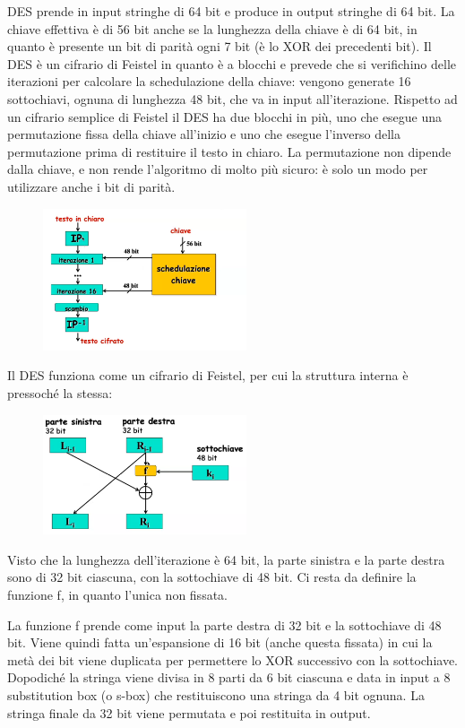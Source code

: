 DES prende in input stringhe di 64 bit e produce in output stringhe di 64 bit. La chiave effettiva è di 56 bit anche se la lunghezza della chiave è di 64 bit, in quanto è presente un bit di parità ogni 7 bit (è lo XOR dei precedenti bit). Il DES è un cifrario di Feistel in quanto è a blocchi e prevede che si verifichino delle iterazioni per calcolare la schedulazione della chiave: vengono generate 16 sottochiavi, ognuna di lunghezza 48 bit, che va in input all'iterazione. Rispetto ad un cifrario semplice di Feistel il DES ha due blocchi in più, uno che esegue una permutazione fissa della chiave all'inizio e uno che esegue l'inverso della permutazione prima di restituire il testo in chiaro. La permutazione non dipende dalla chiave, e non rende l'algoritmo di molto più sicuro: è solo un modo per utilizzare anche i bit di parità.

\begin{figure}[htb!]
    \centering
    \includegraphics[width=6cm]{./Images/cap1/1.2.png}
\end{figure}

Il DES funziona come un cifrario di Feistel, per cui la struttura interna è pressoché la stessa:

\begin{figure}[htb!]
    \centering
    \includegraphics[width=6cm]{./Images/cap1/1.3.png}
\end{figure}

Visto che la lunghezza dell'iterazione è 64 bit, la parte sinistra e la parte destra sono di 32 bit ciascuna, con la sottochiave di 48 bit. Ci resta da definire la funzione f, in quanto l'unica non fissata.

La funzione f prende come input la parte destra di 32 bit e la sottochiave di 48 bit. Viene quindi fatta un'espansione di 16 bit (anche questa fissata) in cui la metà dei bit viene duplicata per permettere lo XOR successivo con la sottochiave. Dopodiché la stringa viene divisa in 8 parti da 6 bit ciascuna e data in input a 8 substitution box (o s-box) che restituiscono una stringa da 4 bit ognuna. La stringa finale da 32 bit viene permutata e poi restituita in output.

